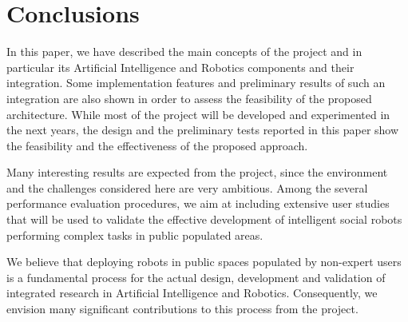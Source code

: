 \section{Conclusions}
\label{sec:conclu}

In this paper, we have described the main concepts of the \coaches project and in particular its Artificial Intelligence and Robotics components and their integration. Some implementation features and preliminary results of such an integration are also shown in order to assess the feasibility of the proposed architecture.
While most of the project will be developed and experimented in the next years, the design and the preliminary tests reported in this paper show the feasibility and the effectiveness of the proposed approach.

Many interesting results are expected from the \coaches project, since the environment and the challenges considered here are very ambitious. 
Among the several performance evaluation procedures, we aim at including extensive user studies that will be used to validate the effective development of intelligent social robots performing complex tasks in public populated areas. 

We believe that deploying robots in public spaces populated by non-expert users is a fundamental process for the actual design, development and validation of integrated research in Artificial Intelligence and Robotics. Consequently, we envision many significant contributions to this process from the \coaches project.





